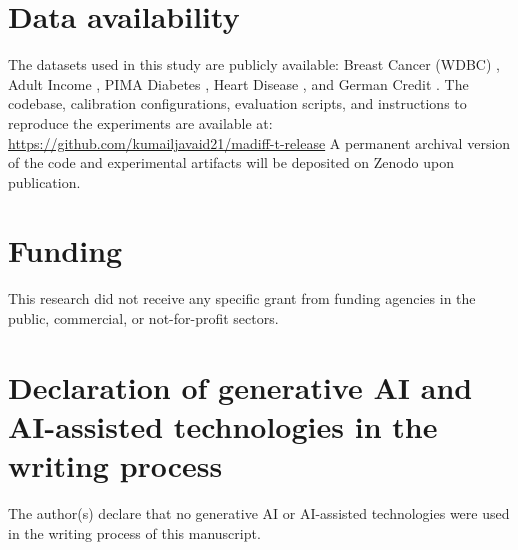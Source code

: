 \documentclass[preprint,12pt]{elsarticle}
\begin{document}
\section*{Data availability}
The datasets used in this study are publicly available: Breast Cancer (WDBC) \cite{BreastCancerWDBC}, Adult Income \cite{AdultIncome}, PIMA Diabetes \cite{PimaDiabetes}, Heart Disease \cite{HeartDisease}, and German Credit \cite{GermanCredit}.
The codebase, calibration configurations, evaluation scripts, and instructions to reproduce the experiments are available at:
\url{https://github.com/kumailjavaid21/madiff-t-release}
A permanent archival version of the code and experimental artifacts will be deposited on Zenodo upon publication.

\section*{Funding}
This research did not receive any specific grant from funding agencies in the public, commercial, or not-for-profit sectors.

\section*{Declaration of generative AI and AI-assisted technologies in the writing process}
The author(s) declare that no generative AI or AI-assisted technologies were used in the writing process of this manuscript.

\end{document}

